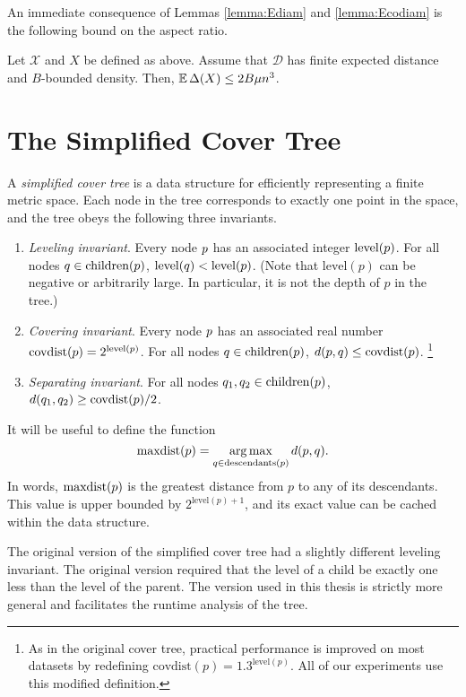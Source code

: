 \documentclass[../main.tex]{subfiles}
\newcommand{\set}[1]{\mathcal {#1}}
\newcommand{\distribution}[1]{\mathcal {#1}}
\newcommand{\dist}[2]{\distf({#1},{#2})}
\newcommand{\distf}{d}
\newcommand{\aspect}[1]{\Delta({#1})}
\newcommand{\p}{\ensuremath p}
\newcommand{\q}{\ensuremath q}
\newcommand{\mkfunction}[1]{\ensuremath{\text{{#1}}}}
\newcommand{\level}[1]      {\mkfunction{level}({#1})}
\newcommand{\children}[1]   {\mkfunction{children}({#1})}
\newcommand{\covdist}[1]    {\mkfunction{covdist}({#1})}
\newcommand{\descendants}[1]{\mkfunction{descendants}({#1})}
\newcommand{\maxdist}[1]    {\mkfunction{maxdist}({#1})}
\begin{document}
An immediate consequence of Lemmas \ref{lemma:Ediam} and \ref{lemma:Ecodiam} is the following bound on the aspect ratio.

\begin{lemma}
    \label{lemma:Easpect}
    Let $\set X$ and $X$ be defined as above.
    Assume that $\distribution D$ has finite expected distance and $B$-bounded density.
    Then, $\E\aspect{X} \le2B\mu n^3$. 
\end{lemma}


\section{The Simplified Cover Tree}

A \emph{simplified cover tree} is a data structure for efficiently representing a finite metric space.
Each node in the tree corresponds to exactly one point in the space,
and the tree obeys the following three invariants.
\begin{enumerate}
    \item \emph{Leveling invariant}.
    Every node $\p$ has an associated integer $\level\p$.
    For all nodes $\q\in\children\p$, $\level\q < \level\p$.
    (Note that $\level{p}$ can be negative or arbitrarily large.
    In particular, it is not the depth of $p$ in the tree.)
    \item \emph{Covering invariant}.
    Every node $\p$ has an associated real number $\covdist\p=2^{\level\p}$.
    For all nodes $\q\in\children\p$, $\dist \p \q \le \covdist\p$.%
    \footnote{
        As in the original cover tree, practical performance is improved on most datasets by redefining $\covdist p = 1.3 ^ {\level p}$.
        All of our experiments use this modified definition.
    }
    \item \emph{Separating invariant}.
    For all nodes $\q_1,\q_2\in\children\p$, $\dist {\q_1} {\q_2} \ge \covdist\p/2$.
\end{enumerate}
It will be useful to define the function
\begin{equation}
\maxdist p = \argmax_{q\in\descendants{p}} \dist p q
.
\end{equation}
In words, $\maxdist\p$ is the greatest distance from $p$ to any of its descendants.
This value is upper bounded by $2^{\level{p}+1}$, 
and its exact value can be cached within the data structure.

\begin{remark}
    The original version of the simplified cover tree \citep{izbicki2015faster} had a slightly different leveling invariant.
    The original version required that the level of a child be exactly one less than the level of the parent.
    The version used in this thesis is strictly more general and facilitates the runtime analysis of the tree.
\end{remark}
\end{document}
